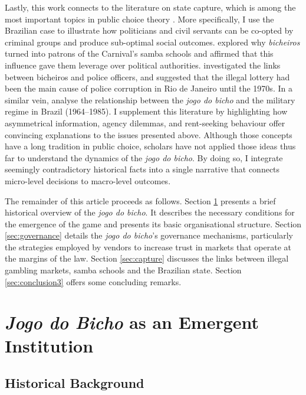 Lastly, this work connects to the literature on state capture, which is among the most important topics in public choice theory \citep{hellman2003seize, rose1978corruption, rose1999corruption, shleifer2002grabbing, tollison1982rent}. More specifically, I use the Brazilian case to illustrate how politicians and civil servants can be co-opted by criminal groups and produce sub-optimal social outcomes. \citet{queiroz1992carnaval} explored why \emph{bicheiros} turned into patrons of the Carnival's samba schools and affirmed that this influence gave them leverage over political authorities. \citet{misse2007illegal} investigated the links between bicheiros and police officers, and suggested that the illegal lottery had been the main cause of police corruption in Rio de Janeiro until the 1970s. In a similar vein, \citet{jupiara2015poroes} analyse the relationship between the \emph{jogo do bicho} and the military regime in Brazil (1964--1985). I supplement this literature by highlighting how asymmetrical information, agency dilemmas, and rent-seeking behaviour offer convincing explanations to the issues presented above. Although those concepts have a long tradition in public choice, scholars have not applied those ideas thus far to understand the dynamics of the \emph{jogo do bicho}. By doing so, I integrate seemingly contradictory historical facts into a single narrative that connects micro-level decisions to macro-level outcomes.

The remainder of this article proceeds as follows. Section \ref{sec:organisation} presents a brief historical overview of the \emph{jogo do bicho}. It describes the necessary conditions for the emergence of the game and presents its basic organisational structure. Section \ref{sec:governance} details the \emph{jogo do bicho}'s governance mechanisms, particularly the strategies employed by vendors to increase trust in markets that operate at the margins of the law. Section \ref{sec:capture} discusses the links between illegal gambling markets, samba schools and the Brazilian state. Section \ref{sec:conclusion3} offers some concluding remarks.

\section{\emph{Jogo do Bicho} as an Emergent Institution}
\label{sec:organisation}

\subsection{Historical Background}
\label{sub:background}


